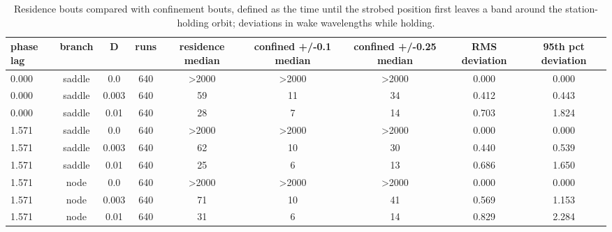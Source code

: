 \begin{table}
\caption{Residence bouts compared with confinement bouts, defined as the time until the strobed position first leaves a band around the station-holding orbit; deviations in wake wavelengths while holding.}
\label{tab:T_confinement}
\begin{ruledtabular}
\begin{tabular}{lcccccccc}
phase lag & branch & D & runs & residence median & confined +/-0.1 median & confined +/-0.25 median & RMS deviation & 95th pct deviation \\
\hline
0.000 & saddle & 0.0 & 640 & >2000 & >2000 & >2000 & 0.000 & 0.000 \\
0.000 & saddle & 0.003 & 640 & 59 & 11 & 34 & 0.412 & 0.443 \\
0.000 & saddle & 0.01 & 640 & 28 & 7 & 14 & 0.703 & 1.824 \\
1.571 & saddle & 0.0 & 640 & >2000 & >2000 & >2000 & 0.000 & 0.000 \\
1.571 & saddle & 0.003 & 640 & 62 & 10 & 30 & 0.440 & 0.539 \\
1.571 & saddle & 0.01 & 640 & 25 & 6 & 13 & 0.686 & 1.650 \\
1.571 & node & 0.0 & 640 & >2000 & >2000 & >2000 & 0.000 & 0.000 \\
1.571 & node & 0.003 & 640 & 71 & 10 & 41 & 0.569 & 1.153 \\
1.571 & node & 0.01 & 640 & 31 & 6 & 14 & 0.829 & 2.284 \\
\end{tabular}
\end{ruledtabular}
\end{table}
